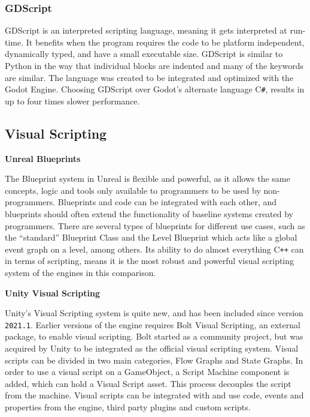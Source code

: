\subsubsection{GDScript} \label{subsubsec:gds}
GDScript is an interpreted scripting language, meaning it gets interpreted at run-time. It benefits when the program requires the code to be platform independent, dynamically typed, and have a small executable size. GDScript is similar to Python in the way that individual blocks are indented and many of the keywords are similar. The language was created to be integrated and optimized with the Godot Engine. \cite{gdscript_basic} Choosing GDScript over Godot's alternate language C\texttt{\#}, results in up to four times slower performance. \cite{godot_engine_c_sharp} 



\subsection{Visual Scripting}

\textbf{Unreal Blueprints} \label{unreal:blueprints}

The Blueprint system in Unreal is flexible and powerful, as it allows the same concepts, logic and tools only available to programmers to be used by non-programmers. Blueprints and code can be integrated with each other, and blueprints should often extend the functionality of baseline systems created by programmers. There are several types of blueprints for different use cases, such as the “standard” Blueprint Class and the Level Blueprint which acts like a global event graph on a level, among others. \cite{unreal_blueprint_overview} Its ability to do almost everything C\texttt{++} can in terms of scripting, means it is the most robust and powerful visual scripting system of the engines in this comparison.

\textbf{Unity Visual Scripting} \label{unity:visual_scripting}


Unity's Visual Scripting system is quite new, and has been included since version \texttt{2021.1}. Earlier versions of the engine requires Bolt Visual Scripting, an external package, to enable visual scripting. Bolt started as a community project, but was acquired by Unity to be integrated as the official visual scripting system. \cite{unity_aquire_bolt} Visual scripts can be divided in two main categories, Flow Graphs and State Graphs. \cite{unity_visual_scripting} In order to use a visual script on a GameObject, a Script Machine component is added, which can hold a Visual Script asset. This process decouples the script from the machine. Visual scripts can be integrated with and use code, events and properties from the engine, third party plugins and custom scripts. \cite{unity_visual_scripting_docs}

